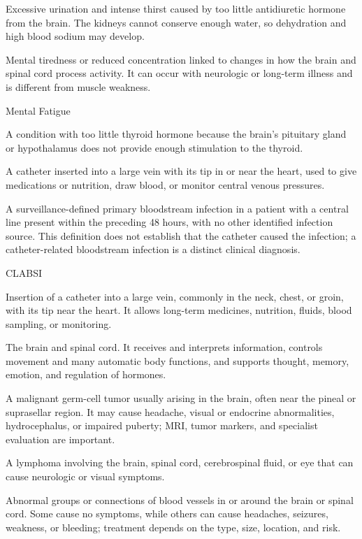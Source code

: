  Excessive urination and intense thirst caused by too little antidiuretic hormone from the brain. The kidneys cannot conserve enough water, so dehydration and high blood sodium may develop.

 Mental tiredness or reduced concentration linked
to changes in how the brain and spinal cord process activity. It can occur
with neurologic or long-term illness and is different from muscle weakness.

\synonyms
Mental Fatigue

 A condition with too little thyroid hormone because the brain's pituitary gland or hypothalamus does not provide enough stimulation to the thyroid.

 A catheter inserted into a large vein with its tip in or near the heart, used to give medications or nutrition, draw blood, or monitor central venous pressures.

 A surveillance-defined
primary bloodstream infection in a patient with a central line present within
the preceding 48 hours, with no other identified infection source. This
definition does not establish that the catheter caused the infection; a
catheter-related bloodstream infection is a distinct clinical diagnosis.

\synonyms
CLABSI

 Insertion of a catheter into a large vein, commonly in the neck, chest, or groin, with its tip near the heart. It allows long-term medicines, nutrition, fluids, blood sampling, or monitoring.

 The brain and spinal cord. It receives and interprets information, controls movement and many automatic body functions, and supports thought, memory, emotion, and regulation of hormones.

 A malignant germ-cell tumor usually arising in the brain, often near the pineal or suprasellar region. It may cause headache, visual or endocrine abnormalities, hydrocephalus, or impaired puberty; MRI, tumor markers, and specialist evaluation are important.

 A lymphoma involving the brain, spinal cord, cerebrospinal fluid, or eye that can cause neurologic or visual symptoms.

 Abnormal groups or connections of blood vessels in or around the brain or spinal cord. Some cause no symptoms, while others can cause headaches, seizures, weakness, or bleeding; treatment depends on the type, size, location, and risk.

